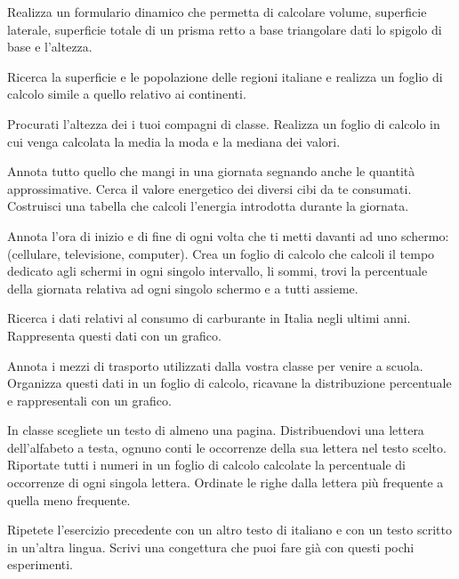 \begin{esercizio}
Realizza un formulario dinamico che permetta di calcolare volume,
superficie laterale, superficie totale di un prisma retto a base
triangolare
dati lo spigolo di base e l'altezza.
\end{esercizio}

\begin{esercizio}
Ricerca la superficie e le popolazione delle regioni italiane e realizza
un foglio di calcolo simile a quello relativo ai continenti.
\end{esercizio}

\begin{esercizio}
Procurati l'altezza dei i tuoi compagni di classe. Realizza un
foglio di calcolo in cui venga calcolata la media la moda e la mediana
dei valori.
\end{esercizio}

\begin{esercizio}
Annota tutto quello che mangi in una giornata segnando anche le quantità
approssimative. Cerca il valore energetico dei diversi cibi da te
consumati. Costruisci una tabella che calcoli l'energia introdotta
durante la giornata.
\end{esercizio}

\begin{esercizio}
Annota l'ora di inizio e di fine di ogni volta che ti metti davanti ad
uno schermo: (cellulare, televisione, computer).
Crea un foglio di calcolo che calcoli il tempo dedicato agli schermi in
ogni singolo intervallo, li sommi, trovi la percentuale della giornata
relativa ad ogni singolo schermo e a tutti assieme.
\end{esercizio}

\begin{esercizio}
Ricerca i dati relativi al consumo di carburante in Italia negli ultimi
anni. Rappresenta questi dati con un grafico.
\end{esercizio}

\begin{esercizio}
Annota i mezzi di trasporto utilizzati dalla vostra classe per venire
a scuola. Organizza questi dati in un foglio di calcolo, ricavane
la distribuzione percentuale e rappresentali con un grafico.
\end{esercizio}

\begin{esercizio}
In classe scegliete un testo di almeno una pagina. Distribuendovi una
lettera dell'alfabeto a testa, ognuno conti le occorrenze della sua
lettera nel testo scelto. Riportate tutti i numeri in un foglio di calcolo
calcolate la percentuale di occorrenze di ogni singola lettera.
Ordinate le righe dalla lettera più frequente a quella meno frequente.
\end{esercizio}

\begin{esercizio}
Ripetete l'esercizio precedente con un altro testo di italiano e con un
testo scritto in un'altra lingua. Scrivi una congettura che puoi fare
già con questi pochi esperimenti.
\end{esercizio}
